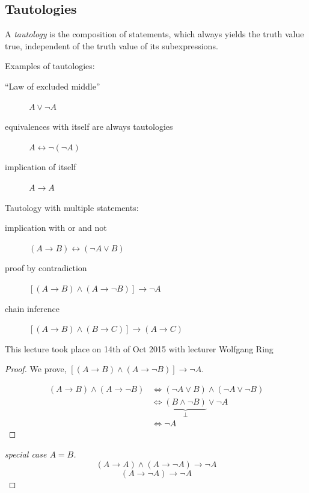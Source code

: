 \documentclass[a4paper,landscape,twocolumn]{article}
\theoremstyle{definition}
\newcommand\meta[3]{\begin{mdframed}[skipbelow=4pt,skipabove=4pt,innermargin=1pt,innerleftmargin=1pt,innerrightmargin=1pt]\begin{center}\small{\textdownarrow{} This #1 took place on #2 with lecturer #3}\end{center}\end{mdframed}}
\begin{document}
\subsection{Tautologies}
%
A \emph{tautology} is the composition of statements, which always yields the truth value
true, independent of the truth value of its subexpressions.

Examples of tautologies:
\begin{description}
  \item[\enquote{Law of excluded middle}] $A \lor \neg A$
  \item[equivalences with itself are always tautologies] $A \leftrightarrow \neg (\neg A)$
  \item[implication of itself] $A \to A$
\end{description}

Tautology with multiple statements:
\begin{description}
  \item[implication with or and not] $(A \to B) \leftrightarrow (\neg A \lor B)$
  \item[proof by contradiction] $\left[(A \to B) \land (A \to \neg B)\right] \to \neg A$
  \item[chain inference] $\left[(A \to B) \land (B \to C)\right] \to (A \to C)$
\end{description}


\meta{lecture}{14th of Oct 2015}{Wolfgang Ring}

\begin{proof}
  We prove, $\left[(A \to B) \land (A \to \neg B)\right] \to \neg A$.

  \begin{align*}
    (A \to B) \land (A \to \neg B) &\iff (\neg A \lor B) \land (\neg A \lor \neg B) \\
      &\iff \underbrace{(B \land \neg B)}_{\bot} \lor \neg A \\
      &\iff \neg A
  \end{align*}
\end{proof}

\begin{proof}[special case $A = B$]
  \[ (A \to A) \land (A \to \neg A) \to \neg A \]
  \[ (A \to \neg A) \to \neg A \]
\end{proof}
\end{document}

